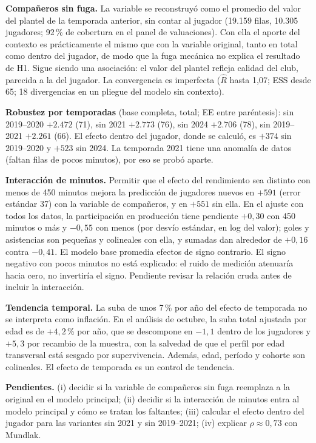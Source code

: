 \documentclass[11pt,a4paper]{article}
\newcommand{\lead}[1]{\textbf{#1}}
\begin{document}
\lead{Compañeros sin fuga.} La variable se reconstruyó como el promedio del valor del plantel de la temporada anterior, sin contar al jugador (19.159 filas, 10.305 jugadores; 92\,\% de cobertura en el panel de valuaciones). Con ella el aporte del contexto es prácticamente el mismo que con la variable original, tanto en total como dentro del jugador, de modo que la fuga mecánica no explica el resultado de H1. Sigue siendo una asociación: el valor del plantel refleja calidad del club, parecida a la del jugador. La convergencia es imperfecta ($\hat R$ hasta 1,07; ESS desde 65; 18 divergencias en un pliegue del modelo sin contexto).

\lead{Robustez por temporadas} (base completa, total; EE entre paréntesis): sin 2019--2020 $+2.472$ (71), sin 2021 $+2.773$ (76), sin 2024 $+2.706$ (78), sin 2019--2021 $+2.261$ (66). El efecto dentro del jugador, donde se calculó, es $+374$ sin 2019--2020 y $+523$ sin 2024. La temporada 2021 tiene una anomalía de datos (faltan filas de pocos minutos), por eso se probó aparte.

\lead{Interacción de minutos.} Permitir que el efecto del rendimiento sea distinto con menos de 450 minutos mejora la predicción de jugadores nuevos en $+591$ (error estándar 37) con la variable de compañeros, y en $+551$ sin ella. En el ajuste con todos los datos, la participación en producción tiene pendiente $+0{,}30$ con 450 minutos o más y $-0{,}55$ con menos (por desvío estándar, en log del valor); goles y asistencias son pequeñas y colineales con ella, y sumadas dan alrededor de $+0{,}16$ contra $-0{,}41$. El modelo base promedia efectos de signo contrario. El signo negativo con pocos minutos no está explicado: el ruido de medición atenuaría hacia cero, no invertiría el signo. Pendiente revisar la relación cruda antes de incluir la interacción.

\lead{Tendencia temporal.} La suba de unos 7\,\% por año del efecto de temporada no se interpreta como inflación. En el análisis de octubre, la suba total ajustada por edad es de $+4{,}2$\,\% por año, que se descompone en $-1{,}1$ dentro de los jugadores y $+5{,}3$ por recambio de la muestra, con la salvedad de que el perfil por edad transversal está sesgado por supervivencia. Además, edad, período y cohorte son colineales. El efecto de temporada es un control de tendencia.

\lead{Pendientes.} (i) decidir si la variable de compañeros sin fuga reemplaza a la original en el modelo principal; (ii) decidir si la interacción de minutos entra al modelo principal y cómo se tratan los faltantes; (iii) calcular el efecto dentro del jugador para las variantes sin 2021 y sin 2019--2021; (iv) explicar $\rho \approx 0{,}73$ con Mundlak.
\end{document}
